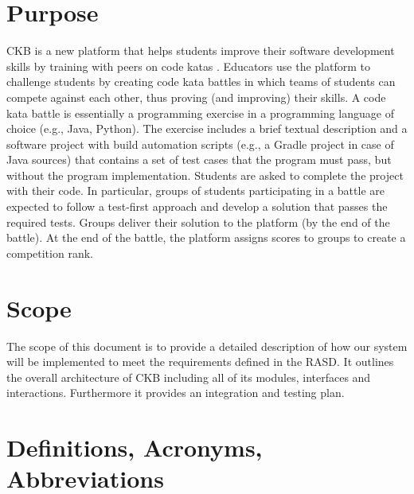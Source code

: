 \section{Purpose}
\ac{CKB} is a new platform that helps students improve their software development skills by training with peers on code katas . Educators use the platform to challenge students by creating code kata battles in which teams of students can compete against each other, thus proving (and improving) their skills.\newline
A code kata battle is essentially a programming exercise in a programming language of choice (e.g., Java, Python). The exercise includes a brief textual description and a software project with build automation scripts (e.g., a Gradle project in case of Java sources) that contains a set of test cases that the program must pass, but without the program implementation. Students are asked to complete the project with their code. In particular, groups of students participating in a battle are expected to follow a test-first approach and develop a solution that passes the required tests. Groups deliver their solution to the platform (by the end of the battle). At the end of the battle, the platform assigns scores to groups to create a competition rank.

\section{Scope}
The scope of this document is to provide a detailed description of how our system will be implemented to meet the requirements defined in the RASD. It outlines the overall architecture of \ac{CKB} including all of its modules, interfaces and interactions. Furthermore it provides an integration and testing plan.

\section{Definitions, Acronyms, Abbreviations}

